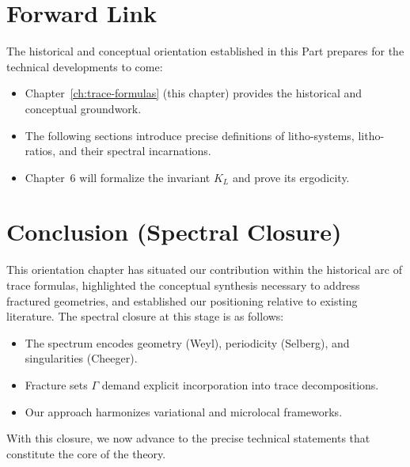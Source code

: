 
\section{Forward Link}

The historical and conceptual orientation established in this Part prepares for the
technical developments to come:

\begin{itemize}
\item Chapter~\ref{ch:trace-formulas} (this chapter) provides the historical and
conceptual groundwork.
\item The following sections introduce precise definitions of litho-systems,
litho-ratios, and their spectral incarnations.
\item Chapter~6 will formalize the invariant $K_L$ and prove its ergodicity.
\end{itemize}


\section*{Conclusion (Spectral Closure)}

This orientation chapter has situated our contribution within the historical arc of
trace formulas, highlighted the conceptual synthesis necessary to address fractured
geometries, and established our positioning relative to existing literature. The
spectral closure at this stage is as follows:

\begin{itemize}
\item The spectrum encodes geometry (Weyl), periodicity (Selberg), and singularities
(Cheeger).
\item Fracture sets $\Gamma$ demand explicit incorporation into trace decompositions.
\item Our approach harmonizes variational and microlocal frameworks.
\end{itemize}

With this closure, we now advance to the precise technical statements that
constitute the core of the theory.

